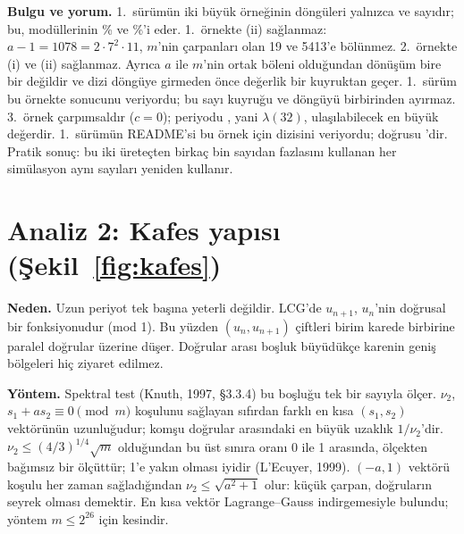 \documentclass[11pt,a4paper]{article}
\begin{document}
\begin{table}[h]
\centering\footnotesize\setlength{\tabcolsep}{4pt}
\caption{Hull--Dobell koşulları ile kuyruk ve döngü uzunlukları (tohum $x_0=1$; 3.\ örnekte $x_0=27$). Koşullar yalnızca
$c\ne0$ için gösterilmiştir.}\label{tab:periyot}
\scriptsize\setlength{\tabcolsep}{1.8pt}
\end{table}

\textbf{Bulgu ve yorum.} 1.\ sürümün iki büyük örneğinin döngüleri yalnızca \ExOnePeriod{} ve \ExTwoPeriod{} sayıdır; bu,
modüllerinin \%\ExOneShare{} ve \%\ExTwoShare{}'i eder. 1.\ örnekte (ii) sağlanmaz: $a-1 = 1078 = 2\cdot7^2\cdot11$, $m$'nin
çarpanları olan 19 ve 5413'e bölünmez. 2.\ örnekte (i) ve (ii) sağlanmaz. Ayrıca $a$ ile $m$'nin ortak böleni
\ExTwoGcd{} olduğundan dönüşüm bire bir değildir ve dizi döngüye girmeden önce \ExTwoTail{} değerlik bir kuyruktan geçer.
1.\ sürüm bu örnekte \VOneStepTwo{} sonucunu veriyordu; bu sayı kuyruğu ve döngüyü birbirinden ayırmaz. 3.\ örnek
çarpımsaldır ($c=0$); periyodu \ExThreePeriod{}, yani $\lambda(32)$, ulaşılabilecek en büyük değerdir. 1.\ sürümün README'si
bu örnek için \ReadmeStated{} dizisini veriyordu; doğrusu \ReadmeComputed{}'dir. Pratik sonuç: bu iki üreteçten birkaç bin
sayıdan fazlasını kullanan her simülasyon aynı sayıları yeniden kullanır.

\section{Analiz 2: Kafes yapısı (Şekil~\ref{fig:kafes})}

\textbf{Neden.} Uzun periyot tek başına yeterli değildir. LCG'de $u_{n+1}$, $u_n$'nin doğrusal bir fonksiyonudur (mod 1). Bu
yüzden $(u_n, u_{n+1})$ çiftleri birim karede birbirine paralel doğrular üzerine düşer. Doğrular arası boşluk büyüdükçe karenin
geniş bölgeleri hiç ziyaret edilmez.

\textbf{Yöntem.} Spektral test (Knuth, 1997, §3.3.4) bu boşluğu tek bir sayıyla ölçer. $\nu_2$, $s_1 + a s_2 \equiv 0 \pmod m$
koşulunu sağlayan sıfırdan farklı en kısa $(s_1,s_2)$ vektörünün uzunluğudur; komşu doğrular arasındaki en büyük uzaklık
$1/\nu_2$'dir. $\nu_2 \le (4/3)^{1/4}\sqrt{m}$ olduğundan bu üst sınıra oranı 0 ile 1 arasında, ölçekten bağımsız bir
ölçüttür; 1'e yakın olması iyidir (L'Ecuyer, 1999). $(-a, 1)$ vektörü koşulu her zaman sağladığından $\nu_2 \le \sqrt{a^2+1}$
olur: küçük çarpan, doğruların seyrek olması demektir. En kısa vektör Lagrange--Gauss indirgemesiyle bulundu; yöntem
$m \le 2^{26}$ için kesindir.
\end{document}
